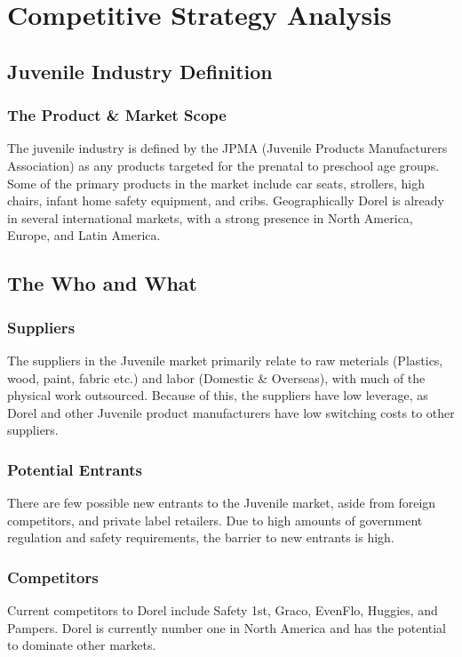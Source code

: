{%
\chapter{Competitive Strategy Analysis}

\section{Juvenile Industry Definition}
\subsection{The Product \& Market Scope}
The juvenile industry is defined by the JPMA (Juvenile Products Manufacturers Association) as any products targeted for the prenatal to preschool age groups.  Some of the primary products in the market include car seats, strollers, high chairs, infant home safety equipment, and cribs.  Geographically Dorel is already in several international markets, with a strong presence in North America, Europe, and Latin America.

\section{The Who and What}
\subsection{Suppliers}
The suppliers in the Juvenile market primarily relate to raw meterials (Plastics, wood, paint, fabric etc.) and labor (Domestic \& Overseas), with much of the physical work outsourced.  Because of this, the suppliers have low leverage, as Dorel and other Juvenile product manufacturers have low switching costs to other suppliers.

\subsection{Potential Entrants}
There are few possible new entrants to the Juvenile market, aside from foreign competitors, and private label retailers.  Due to high amounts of government regulation and safety requirements, the barrier to new entrants is high.

\subsection{Competitors}
Current competitors to Dorel include Safety 1st, Graco, EvenFlo, Huggies, and Pampers.  Dorel is currently number one in North America and has the potential to dominate other markets.

}
